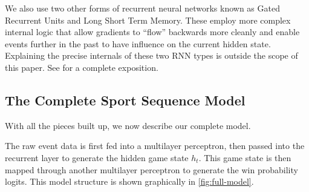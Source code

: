 We also use two other forms of recurrent neural networks known as Gated Recurrent Units and Long Short Term Memory. These employ more complex internal logic that allow gradients to ``flow'' backwards more cleanly and enable events further in the past to have influence on the current hidden state. Explaining the precise internals of these two RNN types is outside the scope of this paper. See \textcite[\S 15.2.7]{PML} for a complete exposition.

\subsection{The Complete Sport Sequence Model}

With all the pieces built up, we now describe our complete model.

The raw event data is first fed into a multilayer perceptron, then passed into the recurrent layer to generate the hidden game state $h_t$. This game state is then mapped through another multilayer perceptron to generate the win probability logits. This model structure is shown graphically in \autoref{fig:full-model}.

